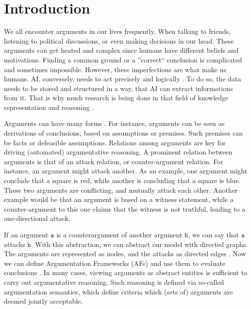 \chapter{Introduction}
We all encounter arguments in our lives frequently. When talking to friends, listening to political discussions, or even making decisions in our head. These arguments can get heated and complex since humans have different beliefs and motivations. Finding a common ground or a ''correct`` conclusion is complicated and sometimes impossible. However, these imperfections are what make us humans. \ac{AI}, conversely, needs to act precisely and logically \cite{DBLP:journals/frai/DietzKM24}. To do so, the data needs to be stored and structured in a way, that AI can extract informations from it. That is why much research is being done in that field of knowledge representation and reasoning \cite{DBLP:journals/dagstuhl-manifestos/DelgrandeG0TW24, DBLP:journals/inffus/PopescuD23}.

Arguments can have many forms \cite{Toulmin_2003}. For instance, arguments can be seen as derivations of conclusions, based on assumptions or premises. Such premises can be facts or defeasible assumptions. Relations among arguments are key for driving (automated) argumentative reasoning. A prominent relation between arguments is that of an attack relation, or counter-argument relation. For instance, an argument might attack another. As an example, one argument might conclude that a square is red, while another is concluding that a square is blue. These two arguments are conflicting, and mutually attack each other. Another example would be that an argument is based on a witness statement, while a counter-argument to this one claims that the witness is not truthful, leading to a one-directional attack.



If an argument $\mathtt{a}$ is a counterargument of another argument $\mathtt{b}$, we can say that $\mathtt{a}$ attacks $\mathtt{b}$. With this abstraction, we can abstract our model with directed graphs. The arguments are represented as nodes, and the attacks as directed edges \cite{DUNG1995321}. Now we can define Argumentation Frameworks (AFs) and use them to evaluate conclusions \cite{DBLP:conf/fapr/Geffner96}. In many cases, viewing arguments as abstract entities is sufficient to carry out argumentative reasoning. Such reasoning is defined via so-called argumentation semantics, which define criteria which (sets of) arguments are deemed jointly acceptable.

